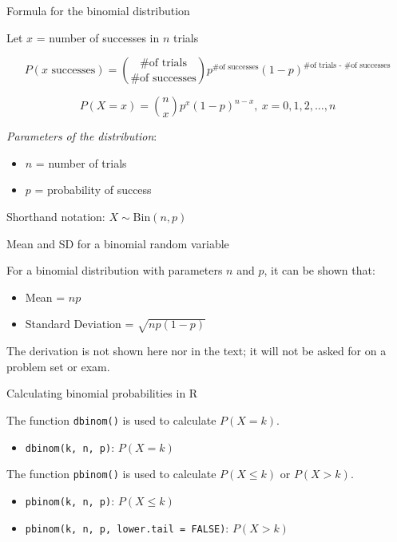 \documentclass[ignorenonframetext,aspectratio=169]{beamer}
\providecommand{\tightlist}{%
  \setlength{\itemsep}{0pt}\setlength{\parskip}{0pt}}
\begin{document}
\begin{frame}{Formula for the binomial distribution}

Let \(x\) = number of successes in \(n\) trials

\begin{footnotesize}
\[P(x \,\,\text{successes}) = \binom{\text{\# of trials}} 
   {\text{\# of successes}} 
   p^{\text{\# of successes}}(1-p)^{\text{\# of trials - \# of successes}}\]
\end{footnotesize}

\[P(X = x)=\binom{n}{x} p^x (1-p)^{n-x},\:  x= 0, 1, 2, \dots, n\]

\emph{Parameters of the distribution}:

\begin{itemize}
\item
  \(n\) = number of trials
\item
  \(p\) = probability of success
\end{itemize}

Shorthand notation: \(X\sim \text{Bin}(n,p)\)

\end{frame}

\begin{frame}{Mean and SD for a binomial random variable}

For a binomial distribution with parameters \(n\) and \(p\), it can be
shown that:

\begin{itemize}
\item
  Mean = \(np\) \medskip 
\item
  Standard Deviation = \(\sqrt{np(1-p)}\) \medskip 
\end{itemize}

The derivation is not shown here nor in the text; it will not be asked
for on a problem set or exam.

\end{frame}

\begin{frame}{Calculating binomial probabilities in \textsf{R}}

The function \texttt{dbinom()} is used to calculate \(P(X = k)\).

\begin{itemize}
\tightlist
\item
  \texttt{dbinom(k, n, p)}: \(P(X = k)\)
\end{itemize}

The function \texttt{pbinom()} is used to calculate \(P(X \leq k)\) or
\(P(X > k)\).

\begin{itemize}
\item
  \texttt{pbinom(k, n, p)}: \(P(X \leq k)\)
\item
  \texttt{pbinom(k, n, p, lower.tail = FALSE)}: \(P(X > k)\)
\end{itemize}

\end{frame}
\end{document}
